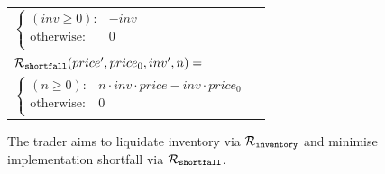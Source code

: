 \begin{itemize}
{\begin{tabular}{ll}
                \qquad $ \begin{cases}
                (inv \geq 0) : & -inv \\
                \text{otherwise} : & 0 \\
                \end{cases} $ & $ $ \\           
            $ \mathcal{R}_{\mathtt{shortfall}}(price', price_0, inv', n) = $ &  $ $ \\
                \qquad $ \begin{cases}
                (n \geq 0) : & n \cdot inv \cdot price - inv \cdot price_0 \\
                \text{otherwise} : & 0 \\
                \end{cases} $ & $ $ \\           
        \end{tabular}
    }    
\end{itemize}

The trader aims to liquidate inventory via {\footnotesize $ \mathcal{R}_{\mathtt{inventory}} $} and minimise implementation shortfall via {\footnotesize $ \mathcal{R}_{\mathtt{shortfall}} $}.

